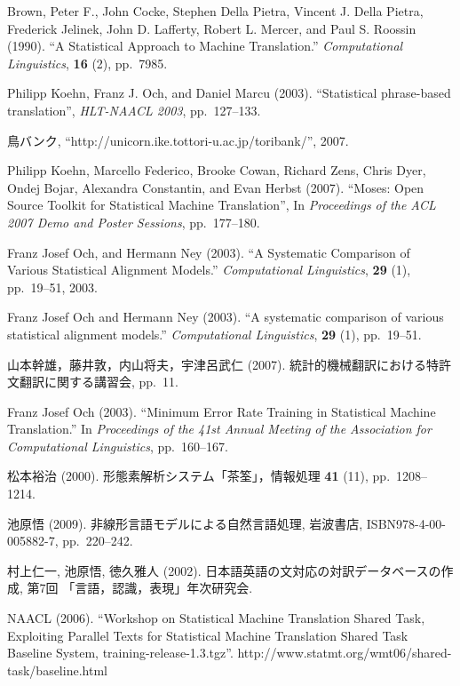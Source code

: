 \documentclass[japanese]{jnlp_1.4}
\begin{document}
\begin{thebibliography}{99}

Brown, Peter F., John Cocke, Stephen Della Pietra,
  Vincent J. Della Pietra, Frederick Jelinek, John D.  Lafferty,
  Robert L. Mercer, and Paul S. Roossin (1990). ``A Statistical Approach to
  Machine Translation.'' \textit{Computational Linguistics}, \textbf{16} (2), pp.~7985.

Philipp Koehn, Franz J. Och, and Daniel Marcu (2003).
``Statistical phrase-based translation'', \textit{HLT-NAACL 2003}, pp.~127--133.

鳥バンク, 
``http://unicorn.ike.tottori-u.ac.jp/toribank/'',  2007.

 Philipp Koehn, Marcello Federico, Brooke Cowan,
  Richard Zens, Chris Dyer, Ondej Bojar, Alexandra Constantin, and Evan
  Herbst (2007). ``Moses: Open Source Toolkit for Statistical Machine
  Translation'', In \textit{Proceedings of the ACL 2007 Demo and Poster Sessions},
  pp.~177--180.

 Franz Josef Och, and Hermann Ney (2003). ``A Systematic Comparison
  of Various Statistical Alignment Models.'' \textit{Computational
  Linguistics}, \textbf{29} (1), pp.~19--51, 2003.

Franz Josef Och and Hermann Ney (2003). ``A systematic
comparison of various statistical alignment models.'' 
\textit{Computational Linguistics}, \textbf{29} (1), pp.~19--51.

山本幹雄，藤井敦，内山将夫，宇津呂武仁 (2007). 統計的機械翻訳における特許文翻訳に関する講習会, pp.~11.

Franz Josef Och (2003). ``Minimum Error Rate Training in Statistical Machine
Translation.'' 
In \textit{Proceedings of the 41st Annual Meeting of the Association
for Computational Linguistics}, pp.~160--167.

松本裕治 (2000). 形態素解析システム「茶筌」，情報処理 \textbf{41} (11), pp.~1208--1214.

池原悟 (2009). 非線形言語モデルによる自然言語処理, 岩波書店, ISBN978-4-00-005882-7,
pp.~220--242.


村上仁一, 池原悟, 徳久雅人 (2002). 日本語英語の文対応の対訳データベースの作成, 第7回 「言語，認識，表現」年次研究会.


NAACL (2006). ``Workshop on Statistical Machine Translation
Shared Task, Exploiting Parallel Texts for Statistical Machine Translation
Shared Task Baseline System,  training-release-1.3.tgz''. http://www.statmt.org/wmt06/shared-task/baseline.html


\end{thebibliography}
\end{document}
